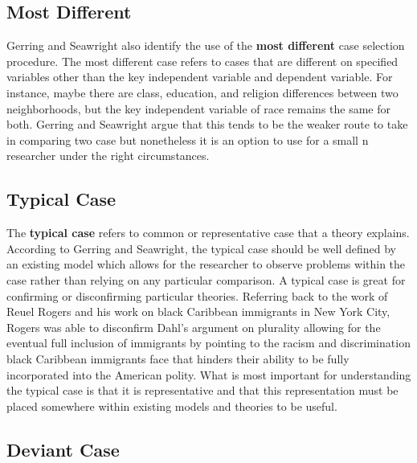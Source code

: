 \documentclass{book}
\begin{document}
\hypertarget{most-different}{%
\subsection{Most Different}\label{most-different}}

Gerring and Seawright also identify the use of the \textbf{most different}
case selection procedure. The most different case refers to cases that are
different on specified variables other than the key independent variable and
dependent variable. For instance, maybe there are class, education, and
religion differences between two neighborhoods, but the key independent
variable of race remains the same for both. Gerring and Seawright argue that
this tends to be the weaker route to take in comparing two case but
nonetheless it is an option to use for a small n researcher under the right
circumstances.

\hypertarget{typical-case}{%
\subsection{Typical Case}\label{typical-case}}

The \textbf{typical case} refers to common or representative case that a
theory explains. According to Gerring and Seawright, the typical case should
be well defined by an existing model which allows for the researcher to
observe problems within the case rather than relying on any particular
comparison. A typical case is great for confirming or disconfirming particular
theories. Referring back to the work of Reuel Rogers and his work on black
Caribbean immigrants in New York City, Rogers was able to disconfirm Dahl's
argument on plurality allowing for the eventual full inclusion of immigrants
by pointing to the racism and discrimination black Caribbean immigrants face
that hinders their ability to be fully incorporated into the American polity.
What is most important for understanding the typical case is that it is
representative and that this representation must be placed somewhere within
existing models and theories to be useful.

\hypertarget{deviant-case}{%
\subsection{Deviant Case}\label{deviant-case}}
\end{document}
